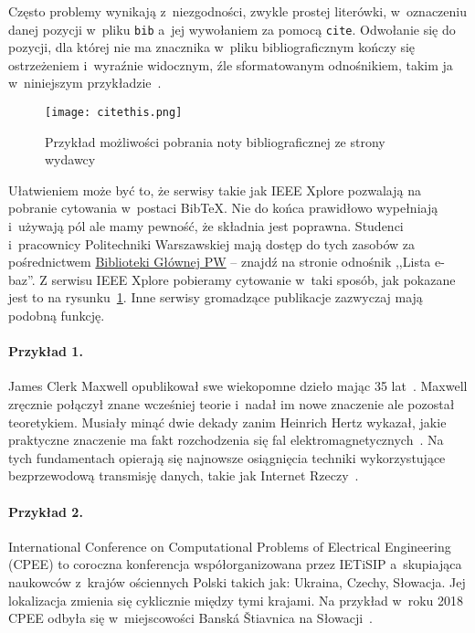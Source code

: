 Często problemy wynikają z~niezgodności, zwykle prostej literówki, w~oznaczeniu danej pozycji w~pliku \texttt{bib} a~jej wywołaniem za pomocą \texttt{cite}. Odwołanie się do pozycji, dla której nie ma znacznika w~pliku bibliograficznym kończy się ostrzeżeniem i~wyraźnie widocznym, źle sformatowanym odnośnikiem, takim ja w~niniejszym przykładzie~\cite{tegoniema}.

\begin{figure}[t]
	\centering \texttt{[image: citethis.png]} %
	\caption{Przykład możliwości pobrania noty bibliograficznej ze strony wydawcy}
	\label{rys:citethis}
\end{figure}

Ułatwieniem może być to, że serwisy takie jak IEEE Xplore pozwalają na pobranie cytowania w~postaci BibTeX. Nie do końca prawidłowo wypełniają i~używają pól ale mamy pewność, że składnia jest poprawna. Studenci i~pracownicy Politechniki Warszawskiej mają dostęp do tych zasobów za pośrednictwem \href{https://bg.pw.edu.pl/}{Biblioteki Głównej PW} -- znajdź na stronie odnośnik ,,Lista e-baz''. Z serwisu IEEE Xplore pobieramy cytowanie w~taki sposób, jak pokazane jest to na rysunku~\ref{rys:citethis}. Inne serwisy gromadzące publikacje zazwyczaj mają podobną funkcję.

\paragraph{Przykład 1.}
James Clerk Maxwell opublikował swe wiekopomne dzieło mając 35 lat~\cite{maxwell1865}. Maxwell zręcznie połączył znane wcześniej teorie i~nadał im nowe znaczenie ale pozostał teoretykiem. Musiały minąć dwie dekady zanim Heinrich Hertz wykazał, jakie praktyczne znaczenie ma fakt rozchodzenia się fal elektromagnetycznych~\cite{cichon1995}. Na tych fundamentach opierają się najnowsze osiągnięcia techniki wykorzystujące bezprzewodową transmisję danych, takie jak Internet Rzeczy~\cite{lncsevo}.

\paragraph{Przykład 2.} International Conference on Computational Problems of Electrical Engineering (CPEE) to coroczna konferencja współorganizowana przez IETiSIP a~skupiająca naukowców z~krajów ościennych Polski takich jak: Ukraina, Czechy, Słowacja. Jej lokalizacja zmienia się cyklicznie między tymi krajami. Na przykład w~roku 2018 CPEE odbyła się w~miejscowości Banská Štiavnica na Słowacji~\cite{cpee2018}.

